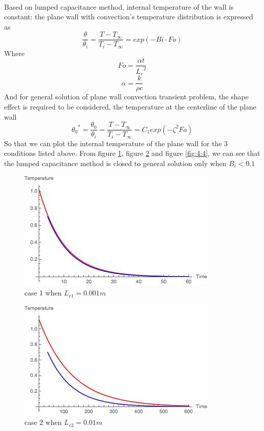 \begin{solution}
~\\
Based on lumped capacitance method, internal temperature of the wall is constant; the plane wall with convection’s temperature distribution is expressed as
$$\frac{\theta}{\theta_i}=
\frac{T-T_\infty}{T_i-T_\infty}=exp(-Bi\cdot Fo)
$$
Where
$$Fo=\frac{\alpha t}{{L_c}^2}$$
$$\alpha=\frac{k}{\rho c}$$
And for general solution of plane wall convection transient problem, the shape effect is required to be considered, the temperature at the centerline of the plane wall
$${\theta_0}^*=\frac{\theta_0}{\theta_i}
=\frac{T-T_\infty}{T_i-T_\infty}=C_1 exp(-\zeta^2Fo)
$$
So that we can plot the internal temperature of the plane wall for the 3 conditions listed above. From figure \ref{fig:4:2}, figure \ref{fig:4:3} and figure \ref{fig:4:4}, we can see that the lumped capacitance method is closed to general solution only when $B_i<0.1$

\begin{figure}[H]
  \centering
    \includegraphics[scale=0.8]{figures/ch4/2}
    \caption{case 1 when $L_{c1}=0.001 m$}
    \label{fig:4:2}
\end{figure}

\begin{figure}[H]
  \centering
    \includegraphics[scale=0.8]{figures/ch4/3}
    \caption{case 2 when $L_{c2}=0.01 m$}
    \label{fig:4:3}
\end{figure}


\end{solution}
